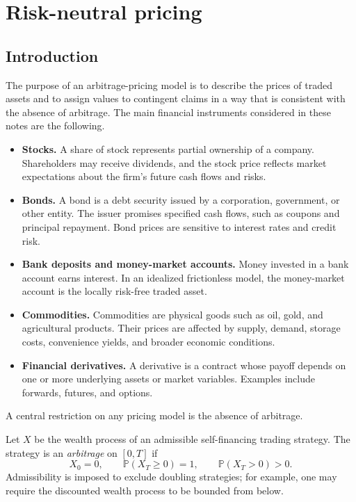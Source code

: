 \section{Risk-neutral pricing}

\subsection{Introduction}

The purpose of an arbitrage-pricing model is to describe the prices of traded assets and to assign values to contingent claims in a way that is consistent with the absence of arbitrage. The main financial instruments considered in these notes are the following.

\begin{itemize}
    \item \textbf{Stocks.} A share of stock represents partial ownership of a company. Shareholders may receive dividends, and the stock price reflects market expectations about the firm's future cash flows and risks.
    \item \textbf{Bonds.} A bond is a debt security issued by a corporation, government, or other entity. The issuer promises specified cash flows, such as coupons and principal repayment. Bond prices are sensitive to interest rates and credit risk.
    \item \textbf{Bank deposits and money-market accounts.} Money invested in a bank account earns interest. In an idealized frictionless model, the money-market account is the locally risk-free traded asset.
    \item \textbf{Commodities.} Commodities are physical goods such as oil, gold, and agricultural products. Their prices are affected by supply, demand, storage costs, convenience yields, and broader economic conditions.
    \item \textbf{Financial derivatives.} A derivative is a contract whose payoff depends on one or more underlying assets or market variables. Examples include forwards, futures, and options.
\end{itemize}

A central restriction on any pricing model is the absence of arbitrage.

\begin{de}
Let $X$ be the wealth process of an admissible self-financing trading strategy. The strategy is an \emph{arbitrage} on $[0,T]$ if
\[
X_0=0,
\qquad
\mathbb{P}(X_T\geq 0)=1,
\qquad
\mathbb{P}(X_T>0)>0.
\]
Admissibility is imposed to exclude doubling strategies; for example, one may require the discounted wealth process to be bounded from below.
\end{de}

